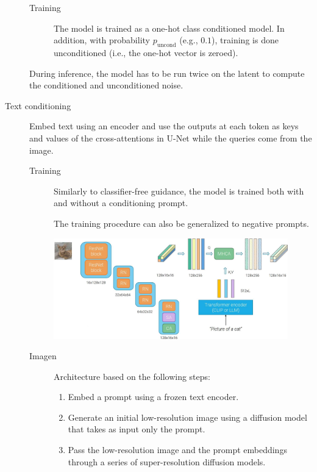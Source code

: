 \begin{description}
        \begin{description}
            \item[Training]
                The model is trained as a one-hot class conditioned model. In addition, with probability $p_\text{uncond}$ (e.g., $0.1$), training is done unconditioned (i.e., the one-hot vector is zeroed).
        \end{description}

        \begin{remark}
            During inference, the model has to be run twice on the latent to compute the conditioned and unconditioned noise.
        \end{remark}

    \item[Text conditioning] 
        Embed text using an encoder and use the outputs at each token as keys and values of the cross-attentions in U-Net while the queries come from the image.

        \begin{description}
            \item[Training] 
                Similarly to classifier-free guidance, the model is trained both with and without a conditioning prompt.

                \begin{remark}
                    The training procedure can also be generalized to negative prompts.
                \end{remark}
        \end{description}

        \begin{figure}[H]
            \centering
            \includegraphics[width=0.75\linewidth]{./img/diffusion_text_conditioning.jpg}
        \end{figure}

        \begin{description}
            \item[Imagen] 
                Architecture based on the following steps:
                \begin{enumerate}
                    \item Embed a prompt using a frozen text encoder.
                    \item Generate an initial low-resolution image using a diffusion model that takes as input only the prompt.
                    \item Pass the low-resolution image and the prompt embeddings through a series of super-resolution diffusion models.
                \end{enumerate}


\end{description}
\end{description}
